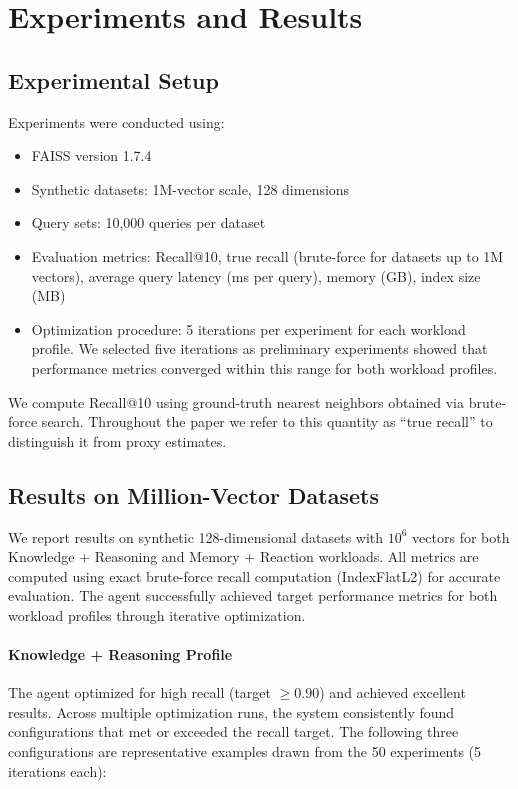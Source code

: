 \documentclass{article}
\begin{document}
\section{Experiments and Results}

\subsection{Experimental Setup}

Experiments were conducted using:
\begin{itemize}
    \item FAISS version 1.7.4
    \item Synthetic datasets: 1M-vector scale, 128 dimensions
    \item Query sets: 10,000 queries per dataset
    \item Evaluation metrics: Recall@10, true recall (brute-force for datasets up to 1M vectors), average query latency (ms per query), memory (GB), index size (MB)
    \item Optimization procedure: 5 iterations per experiment for each workload profile. We selected five iterations as preliminary experiments showed that performance metrics converged within this range for both workload profiles.
\end{itemize}

We compute Recall@10 using ground-truth nearest neighbors obtained via brute-force search. Throughout the paper we refer to this quantity as ``true recall'' to distinguish it from proxy estimates.

\subsection{Results on Million-Vector Datasets}

We report results on synthetic 128-dimensional datasets with $10^6$ vectors for both
Knowledge + Reasoning and Memory + Reaction workloads. All metrics are computed using
exact brute-force recall computation (IndexFlatL2) for accurate evaluation. The agent successfully
achieved target performance metrics for both workload profiles through iterative optimization.

\paragraph{Knowledge + Reasoning Profile}
The agent optimized for high recall (target $\geq 0.90$) and achieved excellent results. Across
multiple optimization runs, the system consistently found configurations that met or exceeded the
recall target. The following three configurations are representative examples drawn from the 50 experiments (5 iterations each):
\end{document}
